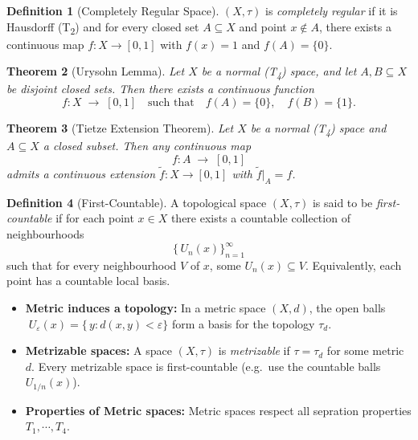 \documentclass[11pt,a4paper]{article}
\theoremstyle{definition}
\newtheorem{definition}{Definition}[section]
\theoremstyle{plain}
\newtheorem{theorem}[definition]{Theorem}
\theoremstyle{remark}
\begin{document}
\begin{definition}[Completely Regular Space]
\((X,\tau)\) is \emph{completely regular} if it is Hausdorff (T\textsubscript{2}) and for every closed set \(A\subseteq X\) and point \(x\notin A\), there exists a continuous map \(f\colon X\to [0,1]\) with \(f(x)=1\) and \(f(A)=\{0\}\).
\end{definition}

\begin{theorem}[Urysohn Lemma]
Let \(X\) be a normal (T\textsubscript{4}) space, and let \(A,B\subseteq X\) be disjoint closed sets.  Then there exists a continuous function
\[
  f\colon X\;\longrightarrow\;[0,1]
  \quad\text{such that}\quad
  f(A)=\{0\},\quad f(B)=\{1\}.
\]
\end{theorem}

\begin{theorem}[Tietze Extension Theorem]
Let \(X\) be a normal (T\textsubscript{4}) space and \(A\subseteq X\) a closed subset.  Then any continuous map
\[
  f\colon A \;\longrightarrow\;[0,1]
\]
admits a continuous extension
\(\tilde f\colon X\to[0,1]\) with \(\tilde f|_A = f\).
\end{theorem}

\begin{definition}[First-Countable]
A topological space \((X,\tau)\) is said to be \emph{first-countable} if for each point \(x\in X\) there exists a countable collection of neighbourhoods 
\[
  \{\,U_{n}(x)\}_{n=1}^\infty
\]
such that for every neighbourhood \(V\) of \(x\), some \(U_n(x)\subseteq V\).  Equivalently, each point has a countable local basis.
\end{definition}

\begin{itemize}
  \item \textbf{Metric induces a topology:}  
    In a metric space \((X,d)\), the open balls 
    \(\;U_\varepsilon(x)=\{\,y:d(x,y)<\varepsilon\}\)
    form a basis for the topology \(\tau_d\).

  \item \textbf{Metrizable spaces:}  
    A space \((X,\tau)\) is \emph{metrizable} if \(\tau=\tau_d\) for some metric \(d\).  
    Every metrizable space is first-countable (e.g.\ use the countable balls \(U_{1/n}(x)\)).

  \item \textbf{Properties of Metric spaces:} Metric spaces respect all sepration properties $T_1, \cdots, T_4$. 
\end{itemize}
\end{document}

